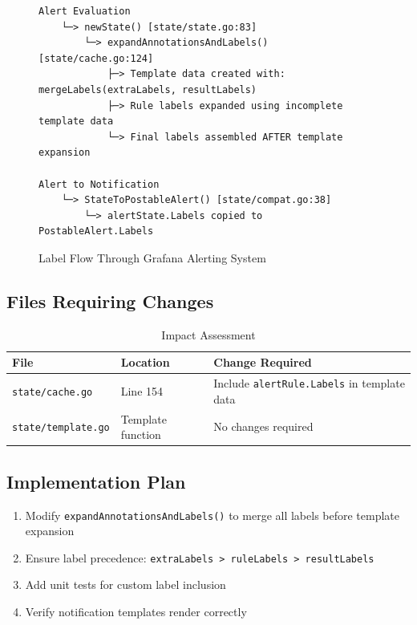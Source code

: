 \documentclass[12pt,a4paper,oneside]{article}
\begin{document}
\begin{figure}[h]
\centering
\begin{verbatim}
Alert Evaluation
    └─> newState() [state/state.go:83]
        └─> expandAnnotationsAndLabels() [state/cache.go:124]
            ├─> Template data created with: mergeLabels(extraLabels, resultLabels)
            ├─> Rule labels expanded using incomplete template data
            └─> Final labels assembled AFTER template expansion

Alert to Notification
    └─> StateToPostableAlert() [state/compat.go:38]
        └─> alertState.Labels copied to PostableAlert.Labels
\end{verbatim}
\caption{Label Flow Through Grafana Alerting System}
\end{figure}

\subsection{Files Requiring Changes}

\begin{table}[h]
\centering
\caption{Impact Assessment}
\begin{tabular}{llp{6cm}}
\toprule
\textbf{File} & \textbf{Location} & \textbf{Change Required} \\
\midrule
\texttt{state/cache.go} & Line 154 & Include \texttt{alertRule.Labels} in template data \\
\texttt{state/template.go} & Template function & No changes required \\
\bottomrule
\end{tabular}
\end{table}

\subsection{Implementation Plan}

\begin{enumerate}
    \item Modify \texttt{expandAnnotationsAndLabels()} to merge all labels before template expansion
    \item Ensure label precedence: \texttt{extraLabels > ruleLabels > resultLabels}
    \item Add unit tests for custom label inclusion
    \item Verify notification templates render correctly
\end{enumerate}
\end{document}
